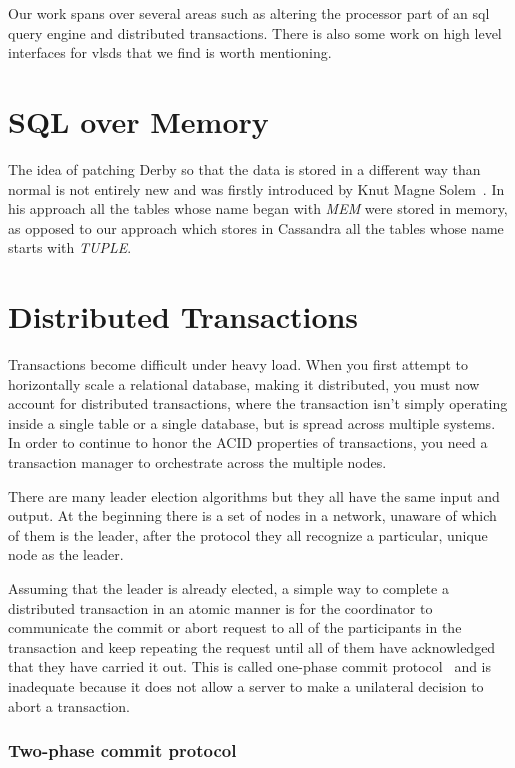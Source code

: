 Our work spans over several areas such as altering the processor part of an \ac{sql} query engine and distributed transactions. There is also some work on high level interfaces for \acp{vlsd} that we find is worth mentioning.

\section{SQL over Memory}
The idea of patching Derby so that the data is stored in a different way than normal is not entirely new and was firstly introduced by Knut Magne Solem~\cite{derbyPatch}. In his approach all the tables whose name began with \emph{MEM} were stored in memory, as opposed to our approach which stores in Cassandra all the tables whose name starts with \emph{TUPLE}.

\section{Distributed Transactions}

Transactions become difficult under heavy load. When you first attempt to horizontally scale a relational database, making it distributed, you must now account for distributed transactions, where the transaction isn’t simply operating inside a single table or a single database, but is spread across multiple systems. In order to continue to honor the ACID properties of transactions, you need a transaction manager to orchestrate across the multiple nodes.

There are many leader election algorithms but they all have the same input and output. At the beginning there is a set of nodes in a network, unaware of which of them is the leader, after the protocol they all recognize a particular, unique node as the leader.

Assuming that the leader is already elected, a simple way to complete a distributed transaction in an atomic manner is for the coordinator to communicate the commit or abort request to all of the participants in the transaction and keep repeating the request until all of them have acknowledged that they have carried it out. This is called one-phase commit protocol~\cite{coulouris2005distributed} and is inadequate because it does not allow a server to make a unilateral decision to abort a transaction. 

\subsubsection{Two-phase commit protocol}

